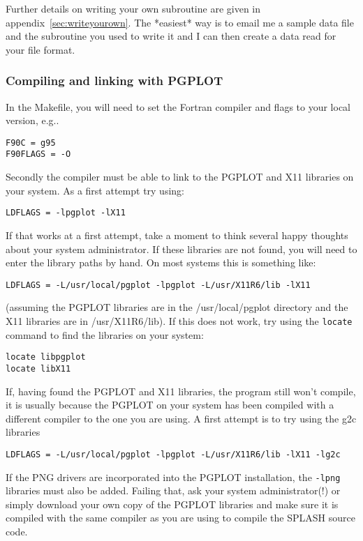 \documentclass[a4paper,11pt]{article}
\begin{document}
Further details on writing your own subroutine are given in
appendix~\ref{sec:writeyourown}. The *easiest* way is to email me a sample data file and the subroutine
you used to write it and I can then create a data read for your file format.

\subsubsection{Compiling and linking with PGPLOT}

 In the Makefile, you will need to set the Fortran compiler and flags to your local version, e.g..
\begin{verbatim}
F90C = g95
F90FLAGS = -O
\end{verbatim}
 Secondly the compiler must be able to link to the PGPLOT and X11 libraries on
your system. As a first attempt try using:
\begin{verbatim}
LDFLAGS = -lpgplot -lX11
\end{verbatim}
If that works at a first attempt, take a moment to think several happy thoughts about your system
administrator. If these libraries are not found, you will need to enter the
library paths by hand. On most systems this is something like:
\begin{verbatim}
LDFLAGS = -L/usr/local/pgplot -lpgplot -L/usr/X11R6/lib -lX11
\end{verbatim}
(assuming the PGPLOT libraries are in the /usr/local/pgplot directory and the
X11 libraries are in /usr/X11R6/lib). If this does not work, try using the
\verb+locate+ command to find the libraries on your system:
\begin{verbatim}
locate libpgplot
locate libX11
\end{verbatim}
 If, having found the PGPLOT and X11
libraries, the program still won't compile, it is usually
because the PGPLOT on your system has been compiled with a different compiler to
the one you are using. A first attempt is to try using the g2c libraries
\begin{verbatim}
LDFLAGS = -L/usr/local/pgplot -lpgplot -L/usr/X11R6/lib -lX11 -lg2c
\end{verbatim}
If the PNG drivers are incorporated into the PGPLOT installation, the \verb+-lpng+ libraries must also be added.
Failing that, ask your system administrator(!) or simply download your own copy of
the PGPLOT libraries and make sure it is compiled with the same compiler as you
are using to compile the SPLASH source code.
\end{document}
